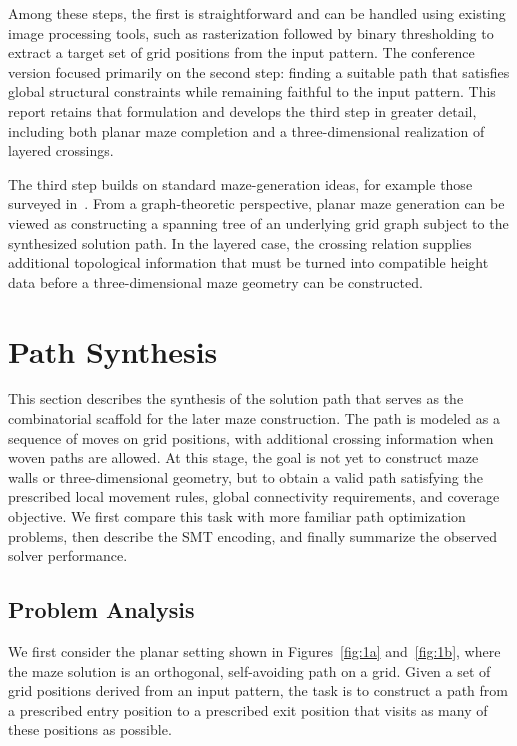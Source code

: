 \documentclass[acmsmall,screen,nonacm]{acmart}
\begin{document}
Among these steps, the first is straightforward and can be handled
using existing image processing tools, such as rasterization followed
by binary thresholding to extract a target set of grid positions from
the input pattern. The conference version focused primarily on the
second step: finding a suitable path that satisfies global structural
constraints while remaining faithful to the input pattern. This report
retains that formulation and develops the third step in greater
detail, including both planar maze completion and a
three-dimensional realization of layered crossings.

The third step builds on standard maze-generation ideas, for example
those surveyed in~\cite{Buck2015MazesForProgrammers}. From a
graph-theoretic perspective, planar maze generation can be viewed as
constructing a spanning tree of an underlying grid graph subject to
the synthesized solution path. In the layered case, the crossing
relation supplies additional topological information that must be
turned into compatible height data before a three-dimensional maze
geometry can be constructed.

\section{Path Synthesis}

This section describes the synthesis of the solution path that serves
as the combinatorial scaffold for the later maze construction. The
path is modeled as a sequence of moves on grid positions, with
additional crossing information when woven paths are allowed. At this
stage, the goal is not yet to construct maze walls or three-dimensional
geometry, but to obtain a valid path satisfying the prescribed local
movement rules, global connectivity requirements, and coverage
objective. We first compare this task with more familiar path
optimization problems, then describe the SMT encoding, and finally
summarize the observed solver performance.

\subsection{Problem Analysis}

We first consider the planar setting shown in Figures~\ref{fig:1a}
and~\ref{fig:1b}, where the maze solution is an orthogonal,
self-avoiding path on a grid. Given a set of grid positions derived
from an input pattern, the task is to construct a path from a
prescribed entry position to a prescribed exit position that visits as
many of these positions as possible.
\end{document}

